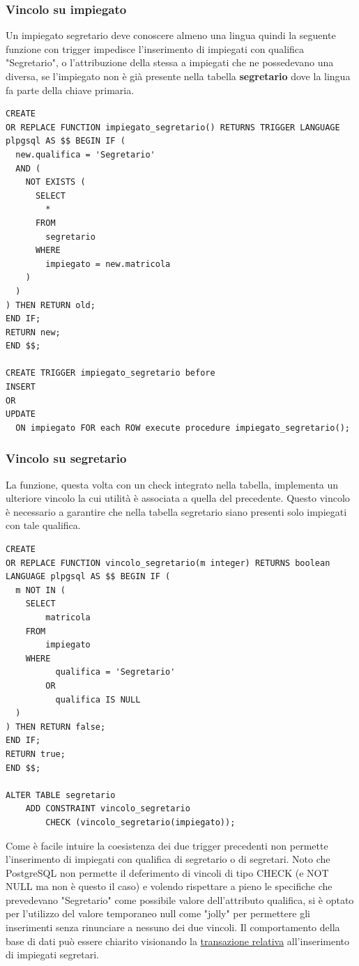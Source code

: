 \documentclass{article}
\begin{document}
\subsubsection*{Vincolo su impiegato}

Un impiegato segretario deve conoscere almeno una lingua quindi la seguente funzione con trigger impedisce l'inserimento di impiegati con qualifica "Segretario", o l'attribuzione della stessa a impiegati che ne possedevano una diversa, se l'impiegato non è già presente nella tabella \textbf{segretario} dove la lingua fa parte della chiave primaria.
\begin{verbatim}
CREATE 
OR REPLACE FUNCTION impiegato_segretario() RETURNS TRIGGER LANGUAGE plpgsql AS $$ BEGIN IF (
  new.qualifica = 'Segretario' 
  AND (
    NOT EXISTS (
      SELECT 
        * 
      FROM 
        segretario 
      WHERE 
        impiegato = new.matricola
    )
  )
) THEN RETURN old;
END IF;
RETURN new;
END $$;

CREATE TRIGGER impiegato_segretario before 
INSERT 
OR 
UPDATE 
  ON impiegato FOR each ROW execute procedure impiegato_segretario();
\end{verbatim}

\newpage

\subsubsection*{Vincolo su segretario}

La funzione, questa volta con un check integrato nella tabella, implementa un ulteriore vincolo la cui utilità è associata a quella del precedente. Questo vincolo è necessario a garantire che nella tabella segretario siano presenti solo impiegati con tale qualifica.
\begin{verbatim}
CREATE 
OR REPLACE FUNCTION vincolo_segretario(m integer) RETURNS boolean LANGUAGE plpgsql AS $$ BEGIN IF (
  m NOT IN (
    SELECT 
        matricola 
    FROM 
        impiegato 
    WHERE 
          qualifica = 'Segretario' 
        OR 
          qualifica IS NULL 
  )
) THEN RETURN false;
END IF;
RETURN true;
END $$;

ALTER TABLE segretario 
    ADD CONSTRAINT vincolo_segretario 
        CHECK (vincolo_segretario(impiegato));
\end{verbatim}
Come è facile intuire la coesistenza dei due trigger precedenti non permette l'inserimento di impiegati con qualifica di segretario o di segretari.
\newline
\newline
Noto che PostgreSQL non permette il deferimento di vincoli di tipo CHECK (e NOT NULL ma non è questo il caso) e volendo rispettare a pieno le specifiche che prevedevano "Segretario" come possibile valore dell'attributo qualifica, si è optato per l'utilizzo del valore temporaneo null come "jolly" per permettere gli inserimenti senza rinunciare a nessuno dei due vincoli.
\newline
\newline
Il comportamento della base di dati può essere chiarito visionando la \hyperlink{page.36}{transazione relativa} all'inserimento di impiegati segretari.
\end{document}
